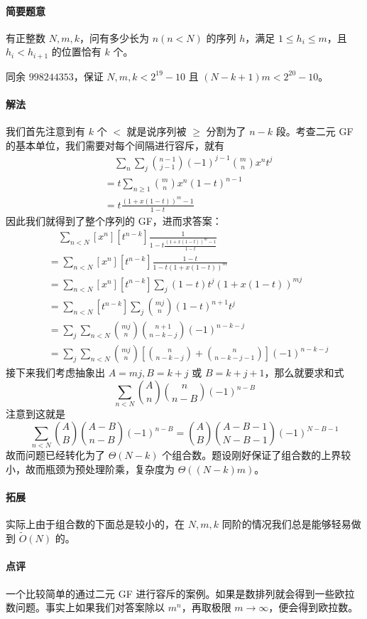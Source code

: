 \documentclass[12pt]{ctexart}
\theoremstyle{theorem}
\theoremstyle{theorem}
\begin{document}
\paragraph{简要题意} 有正整数 $N,m,k$，问有多少长为 $n(n<N)$ 的序列 $h$，满足 $1\le h_i\le m$，且 $h_i<h_{i+1}$ 的位置恰有 $k$ 个。

同余 $998244353$，保证 $N,m,k<2^{19}-10$ 且 $(N-k+1)m<2^{20}-10$。

\paragraph{解法} 我们首先注意到有 $k$ 个 $<$ 就是说序列被 $\ge$ 分割为了 $n-k$ 段。考查二元 GF 的基本单位，我们需要对每个间隔进行容斥，就有
\begin{align*}
&\quad \sum_n\sum_j\binom{n-1}{j-1} (-1)^{j-1} \binom m n x^nt^j\\
&= t\sum_{n\ge 1} \binom m n x^n (1-t)^{n-1}\\
&= t\frac{ (1+x(1-t))^m -1 }{1-t}
\end{align*}
因此我们就得到了整个序列的 GF，进而求答案：
\begin{align*}
&\quad \sum_{n<N}[x^n][t^{n-k}]\frac 1{1-t\frac{ (1+x(1-t))^m -1 }{1-t}}\\
&= \sum_{n<N}[x^n][t^{n-k}]\frac{1-t}{1-t(1+x(1-t))^m}\\
&= \sum_{n<N}[x^n][t^{n-k}]\sum_j (1-t)t^j(1+x(1-t))^{mj}\\
&= \sum_{n<N}[t^{n-k}]\sum_j \binom {mj}n (1-t)^{n+1}t^j\\
&= \sum_j \sum_{n<N} \binom {mj}n \binom{n+1}{n-k-j}(-1)^{n-k-j}\\
&= \sum_j \sum_{n<N} \binom {mj}n \left[ \binom n{n-k-j} + \binom n{n-k-j-1} \right](-1)^{n-k-j}
\end{align*}
接下来我们考虑抽象出 $A=mj,B=k+j$ 或 $B=k+j+1$，那么就要求和式
$$
\sum_{n<N} \binom An \binom{n}{n-B}(-1)^{n-B}
$$
注意到这就是
$$
\sum_{n<N} \binom AB \binom{A-B}{n-B}(-1)^{n-B}
=\binom AB \binom{A-B-1}{N-B-1}(-1)^{N-B-1}
$$
故而问题已经转化为了 $\Theta(N-k)$ 个组合数。题设刚好保证了组合数的上界较小，故而瓶颈为预处理阶乘，复杂度为 $\Theta((N-k)m)$。

\paragraph{拓展} 实际上由于组合数的下面总是较小的，在 $N,m,k$ 同阶的情况我们总是能够轻易做到 $\tilde O(N)$ 的。

\paragraph{点评} 一个比较简单的通过二元 GF 进行容斥的案例。如果是数排列就会得到一些欧拉数问题。事实上如果我们对答案除以 $m^n$，再取极限 $m \rightarrow \infty$，便会得到欧拉数。
\end{document}
